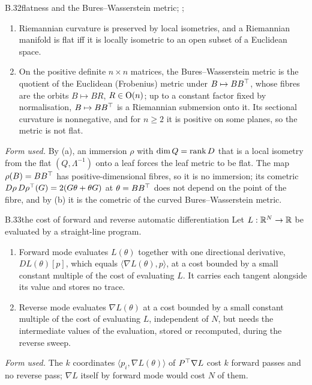 \begin{auxresult}{B.32}{flatness and the Bures--Wasserstein metric}{\citep[Ch.~7]{xlee2018introduction};
\citep{xtakatsu2011wasserstein}; \citep{xbhatia2019bures}}
\begin{enumerate}[label=(\alph*)]
  \item Riemannian curvature is preserved by local isometries, and a Riemannian manifold is flat iff it is locally
    isometric to an open subset of a Euclidean space.
  \item On the positive definite $n\times n$ matrices, the Bures--Wasserstein metric is the quotient of the Euclidean
    (Frobenius) metric under $B\mapsto BB^{\top}$, whose fibres are the orbits $B\mapsto BR$, $R\in\mathrm{O}(n)$; up to a constant
    factor fixed by normalisation, $B\mapsto BB^{\top}$ is a Riemannian submersion onto it. Its sectional curvature is
    nonnegative, and for $n\ge2$ it is positive on some planes, so the metric is not flat.
\end{enumerate}
\end{auxresult}
\noindent\emph{Form used.} By (a), an immersion $\rho$ with $\dim Q=\operatorname{rank} D$ that is a local isometry from the flat
$(Q,\Lambda^{-1})$ onto a leaf forces the leaf metric to be flat. The map $\rho(B)=BB^{\top}$ has positive-dimensional fibres,
so it is no immersion; its cometric $D\rho\,D\rho^{\top}(G)=2(G\theta+\theta G)$ at $\theta=BB^{\top}$ does not depend on the point
of the fibre, and by (b) it is the cometric of the curved Bures--Wasserstein metric.

\begin{auxresult}{B.33}{the cost of forward and reverse automatic differentiation}{\citep[Ch.~3 and
4]{xgriewank2008evaluating}}
Let $L:\mathbb{R}^N\to\mathbb{R}$ be evaluated by a straight-line program.
\begin{enumerate}[label=(\alph*)]
  \item Forward mode evaluates $L(\theta)$ together with one directional derivative, $DL(\theta)[p]$, which equals
    $\langle\nabla L(\theta),p\rangle$, at a cost bounded by a small constant multiple of the cost of evaluating $L$. It
    carries each tangent alongside its value and stores no trace.
  \item Reverse mode evaluates $\nabla L(\theta)$ at a cost bounded by a small constant multiple of the cost of evaluating
    $L$, independent of $N$, but needs the intermediate values of the evaluation, stored or recomputed, during the
    reverse sweep.
\end{enumerate}
\end{auxresult}
\noindent\emph{Form used.} The $k$ coordinates $\langle p_i,\nabla L(\theta)\rangle$ of $P^{\top}\nabla L$ cost $k$ forward
passes and no reverse pass; $\nabla L$ itself by forward mode would cost $N$ of them.

